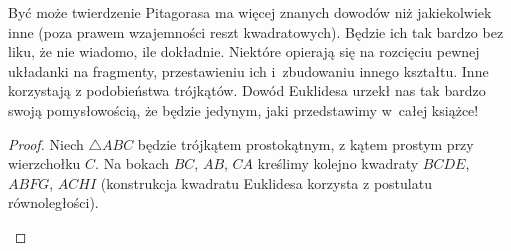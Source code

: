 Być może twierdzenie Pitagorasa ma więcej znanych dowodów niż jakiekolwiek inne (poza prawem wzajemności reszt kwadratowych).
Będzie ich tak bardzo bez liku, że nie wiadomo, ile dokładnie.
Niektóre opierają się na rozcięciu pewnej układanki na fragmenty, przestawieniu ich i~zbudowaniu innego kształtu.
Inne korzystają z podobieństwa trójkątów.
Dowód Euklidesa urzekł nas tak bardzo swoją pomysłowością, że będzie jedynym, jaki przedstawimy w~całej książce!

\begin{proof}
    Niech $\triangle ABC$ będzie trójkątem prostokątnym, z kątem prostym przy wierzchołku $C$.
    Na bokach $BC$, $AB$, $CA$ kreślimy kolejno kwadraty $BCDE$, $ABFG$, $ACHI$ (konstrukcja kwadratu Euklidesa korzysta z postulatu równoległości).

    \begin{center}
\begin{comment}
        \begin{tikzpicture}[scale=.4]
        \tkzDefPoint(105:3){A}
        \tkzDefPoint(285:3){B}
        \tkzDefPoint(35:3){C}
        \tkzDefPoint(35:4.75){CC}

        \tkzLabelPoint[above left](A){$A$}
        \tkzLabelPoint[below](B){$B$}
        \tkzLabelPoint[below left](CC){$C$}
        \tkzDefSquare(B,A)
        \tkzGetPoints{G}{F}
        \tkzLabelPoint[below](F){$F$}
        \tkzLabelPoint[above](G){$G$}
        \tkzDefPointsBy[projection=onto A--B](C){K}
        \tkzDefPointsBy[projection=onto G--F](C){L}

        \tkzDrawPolygon[line width=0.3mm, fill=blue!10](A,K,L,G)
        \tkzDrawPolygon[line width=0.3mm, fill=red!10](B,K,L,F)
        \tkzDrawPolygon[line width=0.3mm](A,B,F,G)
        \tkzLabelPoint[below left](K){$K$}
        \tkzLabelPoint[left](L){$L$}


\end{comment}
\end{center}
\end{proof}
